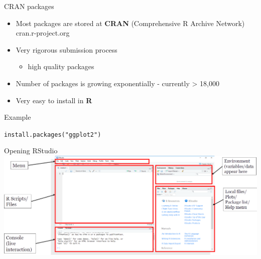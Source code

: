 \documentclass[
  ignorenonframetext,
  aspectratio=169]{beamer}
\providecommand{\tightlist}{%
  \setlength{\itemsep}{0pt}\setlength{\parskip}{0pt}}
\begin{document}
\begin{frame}[fragile]{CRAN packages}
\protect\hypertarget{cran-packages}{}
\begin{itemize}
\tightlist
\item
  Most packages are stored at \textbf{CRAN} (Comprehensive R Archive
  Network)\\
  cran.r-project.org
\item
  Very rigorous submission process

  \begin{itemize}
  \tightlist
  \item
    high quality packages
  \end{itemize}
\item
  Number of packages is growing exponentially - currently \textgreater{}
  18,000
\item
  Very easy to install in \textbf{R}
\end{itemize}

Example

\texttt{install.packages("ggplot2")}
\end{frame}

\begin{frame}{Opening RStudio}
\protect\hypertarget{opening-rstudio}{}
\includegraphics[width=1\textwidth,height=\textheight]{figures/Rstudio_interface.png}
\end{frame}
\end{document}
